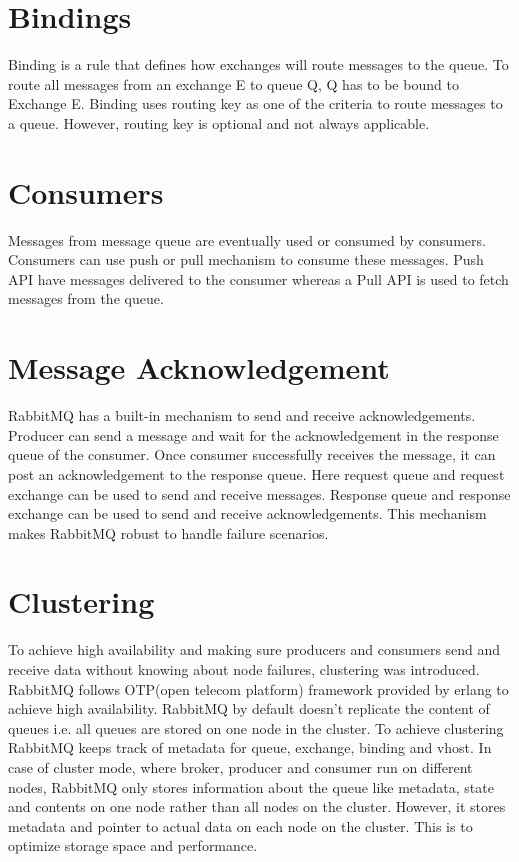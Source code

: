 \documentclass[9pt,twocolumn,twoside]{styles/osajnl}
\begin{document}
\section{Bindings}
Binding is a rule that defines how exchanges will route messages to the queue.
To route all messages from an exchange E to queue Q, Q has to be bound to
Exchange E. Binding uses routing key as one of the criteria to route messages to
a queue. However, routing key is optional and not always applicable.

\section{Consumers}
Messages from message queue are eventually used or consumed by consumers.
Consumers can use push or pull mechanism to consume these messages. Push API
have messages delivered to the consumer whereas a Pull API is used to fetch
messages from the queue. 

\section{Message Acknowledgement}
RabbitMQ has a built-in mechanism to send and receive acknowledgements. Producer
can send a message and wait for the acknowledgement in the response queue of the
consumer.  Once consumer successfully receives the message, it can post an
acknowledgement to the response queue. Here request queue and request exchange
can be used to send and receive messages. Response queue and response
exchange can be used to send and receive acknowledgements. This mechanism makes
RabbitMQ robust to handle failure scenarios.

\section{Clustering}
To achieve high availability \cite{videla2012rabbitmq} and making sure producers
and consumers send and receive data without knowing about node failures,
clustering was introduced. RabbitMQ follows OTP(open telecom platform) framework
provided by erlang to achieve high availability. RabbitMQ by default doesn't
replicate the content of queues i.e. all queues are stored on one node in the
cluster. To achieve clustering RabbitMQ keeps track of metadata for queue,
exchange, binding and vhost. In case of cluster mode, where broker, producer and
consumer run on different nodes, RabbitMQ only stores information about the
queue like metadata, state and contents on one node rather than all nodes on the
cluster. However, it stores metadata and pointer to actual data on each node on
the cluster. This is to optimize storage space and performance. 
\end{document}
